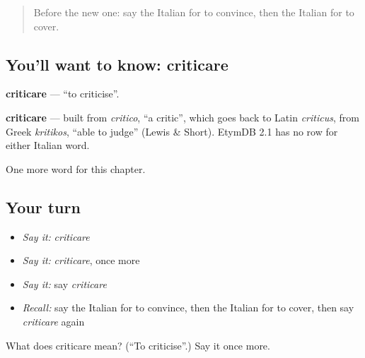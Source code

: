\label{lesson:IT-C145-criticare}



\begin{quote}
Before the new one: say the Italian for to convince, then the Italian for to cover.
\end{quote}

\subsection*{You'll want to know: criticare}
\textbf{criticare} — \textquotedblleft{}to criticise\textquotedblright{}.

\begin{cousinweb}
\textbf{criticare} — built from \emph{critico}, \textquotedblleft{}a critic\textquotedblright{}, which goes back to Latin \emph{criticus}, from Greek \emph{kritikos}, \textquotedblleft{}able to judge\textquotedblright{} (Lewis \& Short). EtymDB 2.1 has no row for either Italian word.
\end{cousinweb}

\begin{grammarlens}[title={What you've built}]
One more word for this chapter.
\end{grammarlens}

\subsection*{Your turn}
\begin{itemize}
\raggedright
  \item \emph{Say it:} \emph{criticare}
  \item \emph{Say it:} \emph{criticare}, once more
  \item \emph{Say it:} say \emph{criticare}
  \item \emph{Recall:} say the Italian for to convince, then the Italian for to cover, then say \emph{criticare} again
\end{itemize}

\begin{tcolorbox}[breakable,colback=teal!4,colframe=teal!35!black,title={Before you move on}]
What does criticare mean? (\textquotedblleft{}To criticise\textquotedblright{}.) Say it once more.
\end{tcolorbox}

